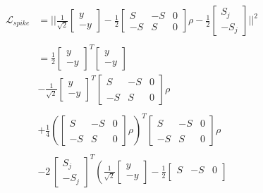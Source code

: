 \begin{enumerate}
\begin{align*}
\mathcal{L}_{spike} &= || 
\frac{1}{\sqrt{2}}
\begin{bmatrix}
y \\-y
\end{bmatrix}
-
\frac{1}{2}
\begin{bmatrix}
S & - S & 0 
\\
-S & S & 0
\end{bmatrix}\rho
-
\frac{1}{2}
\begin{bmatrix}
S_j \\ -S_j
\end{bmatrix}
||^2
\\
\\
&=
\frac{1}{2}
\begin{bmatrix}
y \\-y
\end{bmatrix}^T \begin{bmatrix}
y \\-y
\end{bmatrix}
\\
 &- \frac{1}{\sqrt{2}}
 \begin{bmatrix}
y \\-y
\end{bmatrix}^T \begin{bmatrix}
S & - S & 0 
\\
\\
-S & S & 0
\end{bmatrix}\rho
\\
\\
&+ 
\frac{1}{4}
\left(\begin{bmatrix}
S & - S & 0 
\\
\\
-S & S & 0
\end{bmatrix}\rho\right)^T \begin{bmatrix}
S & - S & 0 
\\
\\
-S & S & 0
\end{bmatrix}\rho
\\
\\
&- 
2\, \begin{bmatrix}
S_j \\ -S_j
\end{bmatrix}^T \left(\frac{1}{\sqrt{2}}
\begin{bmatrix}
y \\-y
\end{bmatrix}
-
\frac{1}{2}
\begin{bmatrix}
S & - S & 0 
\\

\end{bmatrix}
\end{align*}
\end{enumerate}
